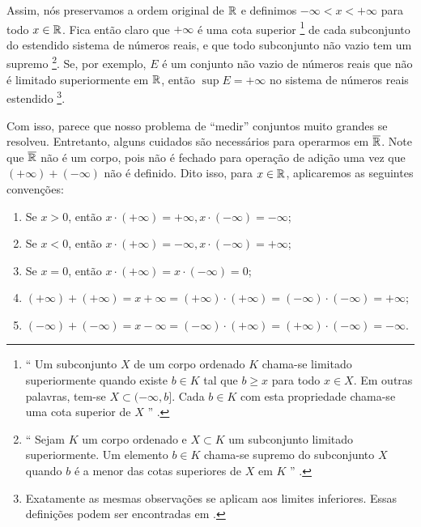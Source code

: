 	Assim, nós preservamos a ordem original de $\mathbb{R}$ e definimos
	$-\infty < x < +\infty$ para todo $x \in \mathbb{R}$.
	Fica então claro que $+\infty$ é uma cota superior
	\footnote{
		\enquote{
		Um subconjunto $X$ de um corpo ordenado $K$ chama-se limitado superiormente quando existe $b \in K$ tal que 
		$b \geq x$ para todo $x \in X$. 
		Em outras palavras, tem-se $X \subset (-\infty, b]$.
		Cada $b \in K$ com esta propriedade chama-se uma cota superior de $X$
		} \cite[p.74]{elon}.
	} 
	de cada subconjunto do estendido sistema de números reais, e que todo subconjunto não vazio tem um supremo
	\footnote{
		\enquote{
		Sejam $K$ um corpo ordenado e $X \subset K$ um subconjunto limitado superiormente. 
		Um elemento $b \in K$ chama-se supremo do subconjunto $X$ quando $b$ é a menor das cotas superiores de $X$ em	$K$
		} \cite[p.75]{elon}.
	}.
	Se, por exemplo, $E$ é um conjunto não vazio de números reais que não é limitado superiormente em $\mathbb{R}$, então $\sup E = + \infty$ no sistema de números reais estendido
	\footnote{
	Exatamente as mesmas observações se aplicam aos limites inferiores.
	Essas definições podem ser encontradas em \cite[p.12]{rudin}.
	}.
	
    Com isso, parece que nosso problema de \enquote{medir} conjuntos muito grandes se resolveu.
    Entretanto, alguns cuidados são necessários para operarmos em $\operatorname{\overline{\mathbb{R}}}$.
    Note que $\operatorname{\overline{\mathbb{R}}}$ não é um corpo, pois não é fechado para operação de adição uma vez que $(+\infty) + (-\infty)$ não é definido.
    Dito isso, para $x \in \mathbb{R}$, aplicaremos as seguintes convenções:
    \begin{enumerate}[label*=(\alph*)]
    	\item Se $x > 0$, então $x \cdot (+\infty) = +\infty, x \cdot (-\infty) = -\infty$;
    	\item Se $x < 0$, então $x \cdot (+\infty) = -\infty, x \cdot (-\infty) = +\infty$;
    	\item Se $x = 0$, então 
    	$x\cdot (+\infty) = x\cdot (-\infty) = 0$;
    	\item $(+ \infty) + (+ \infty)  = x + \infty = (+ \infty) \cdot  (+ \infty) = (- \infty) \cdot (- \infty) = + \infty$;
    	\item $(- \infty) + (- \infty)  = x - \infty = (- \infty) \cdot  (+ \infty) = (+ \infty) \cdot (- \infty) = - \infty$.
    \end{enumerate}
    
